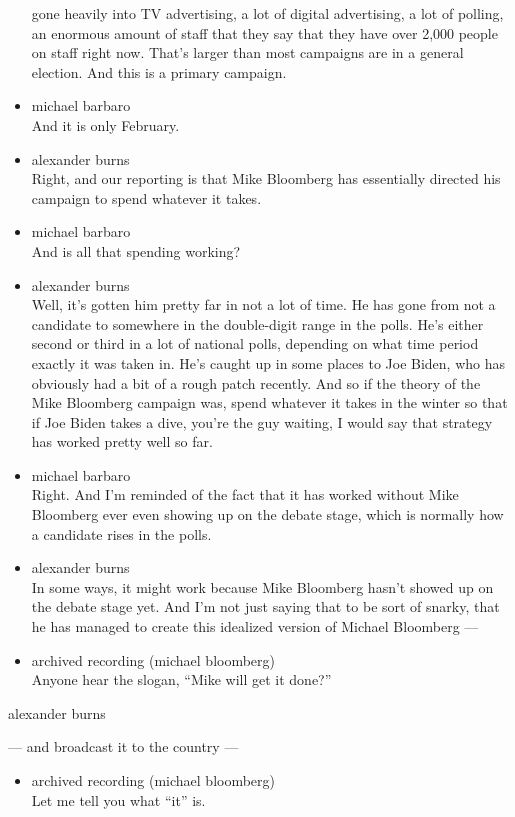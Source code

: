 \begin{itemize}
  gone heavily into TV advertising, a lot of digital advertising, a lot
  of polling, an enormous amount of staff that they say that they have
  over 2,000 people on staff right now. That's larger than most
  campaigns are in a general election. And this is a primary campaign.
\item
  michael barbaro\\
  And it is only February.
\item
  alexander burns\\
  Right, and our reporting is that Mike Bloomberg has essentially
  directed his campaign to spend whatever it takes.
\item
  michael barbaro\\
  And is all that spending working?
\item
  alexander burns\\
  Well, it's gotten him pretty far in not a lot of time. He has gone
  from not a candidate to somewhere in the double-digit range in the
  polls. He's either second or third in a lot of national polls,
  depending on what time period exactly it was taken in. He's caught up
  in some places to Joe Biden, who has obviously had a bit of a rough
  patch recently. And so if the theory of the Mike Bloomberg campaign
  was, spend whatever it takes in the winter so that if Joe Biden takes
  a dive, you're the guy waiting, I would say that strategy has worked
  pretty well so far.
\item
  michael barbaro\\
  Right. And I'm reminded of the fact that it has worked without Mike
  Bloomberg ever even showing up on the debate stage, which is normally
  how a candidate rises in the polls.
\item
  alexander burns\\
  In some ways, it might work because Mike Bloomberg hasn't showed up on
  the debate stage yet. And I'm not just saying that to be sort of
  snarky, that he has managed to create this idealized version of
  Michael Bloomberg ---
\item
  archived recording (michael bloomberg)\\
  Anyone hear the slogan, ``Mike will get it done?''
\end{itemize}

alexander burns

--- and broadcast it to the country ---

\begin{itemize}
\tightlist
\item
  archived recording (michael bloomberg)\\
  Let me tell you what ``it'' is.
\end{itemize}

